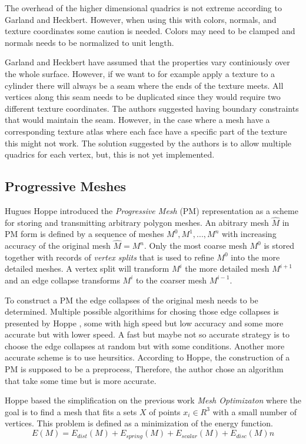The overhead of the higher dimensional quadrics is not extreme according to Garland and Heckbert. However, when using this with colors, normals, and texture coordinates some caution is needed. Colors may need to be clamped and normals needs to be normalized to unit length.

Garland and Heckbert have assumed that the properties vary continiously over the whole surface. However, if we want to for example apply a texture to a cylinder there will always be a seam where the ends of the texture meets. All vertices along this seam needs to be duplicated since they would require two different texture coordinates. The authors suggested having boundary constraints that would maintain the seam. However, in the case where a mesh have a corresponding texture atlas where each face have a specific part of the texture this might not work. The solution suggested by the authors is to allow multiple quadrics for each vertex, but, this is not yet implemented.

\subsection{Progressive Meshes} \label{sec:progressive_meshes}
Hugues Hoppe \cite{hoppe1996progressive} introduced the \emph{Progressive Mesh} (PM) representation as a scheme for storing and transmitting arbitrary polygon meshes. An abitrary mesh $\hat{M}$ in PM form is defined by a sequence of meshes $M^0, M^1, ..., M^n$ with increasing accuracy of the original mesh $\hat{M} = M^n$. Only the most coarse mesh $M^0$ is stored together with records of \emph{vertex splits} that is used to refine $M^0$ into the more detailed meshes. A vertex split will transform $M^i$ the more detailed mesh $M^{i+1}$ and an edge collapse transforms $M^i$ to the coarser mesh $M^{i-1}$.

To construct a PM the edge collapses of the original mesh needs to be determined. Multiple possible algorithims for chosing those edge collapses is presented by Hoppe \cite{hoppe1996progressive}, some with high speed but low accuracy and some more accurate but with lower speed. A fast but maybe not so accurate strategy is to choose the edge collapses at random but with some conditions. Another more accurate scheme is to use heursitics. According to Hoppe, the construction of a PM is supposed to be a preprocess, Therefore, the author chose an algorithm that take some time but is more accurate.

Hoppe based the simplification on the previous work \emph{Mesh Optimizaton} \cite{hoppe1993mesh} where the goal is to find a mesh that fits a sets $X$ of points $x_i \in R^3$ with a small number of vertices. This problem is defined as a minimization of the energy function.
\begin{equation}
  E(M) = E_{dist}(M) + E_{spring}(M) + E_{scalar}(M) + E_{disc}(M)n
\end{equation}


